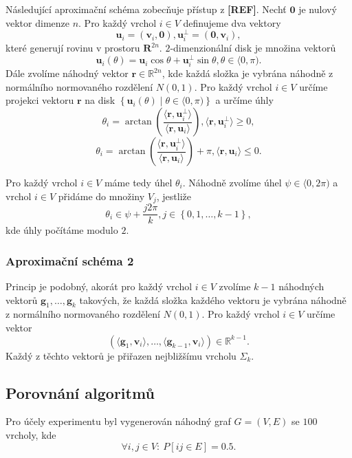 Následující aproximační schéma zobecňuje přístup z \textbf{[REF]}. Nechť $\mathbf{0}$ je nulový vektor dimenze $n$. Pro každý vrchol $i \in V$ definujeme dva vektory
$$
    \mathbf{u}_i = \left( \mathbf{v}_i, \mathbf{0} \right), \mathbf{u}_i^\bot = \left( \mathbf{0}, \mathbf{v}_i \right),
$$
které generují rovinu v prostoru $\mathbf{R}^{2n}$. $2$-dimenzionální disk je množina vektorů
$$
    \mathbf{u}_i(\theta) = \mathbf{u}_i \cos \theta + \mathbf{u}_i^\bot \sin \theta, \theta \in \langle 0, \pi).
$$
Dále zvolíme náhodný vektor $\mathbf{r} \in \mathbb{R}^{2n}$, kde každá složka je vybrána náhodně z normálního normovaného rozdělení $N(0,1)$. Pro každý vrchol $i \in V$ určíme projekci vektoru $\mathbf{r}$ na disk $\left\{ \mathbf{u}_i(\theta) \mid \theta \in \langle 0, \pi ) \right\}$ a určíme úhly
$$
    \theta_i = \arctan \left( \frac{\langle \mathbf{r}, \mathbf{u}_i^\bot \rangle}{\langle \mathbf{r}, \mathbf{u}_i \rangle} \right), \langle \mathbf{r}, \mathbf{u}_i^\bot \rangle \geq 0,
$$
$$
    \theta_i = \arctan \left( \frac{\langle \mathbf{r}, \mathbf{u}_i^\bot \rangle}{\langle \mathbf{r}, \mathbf{u}_i \rangle} \right) + \pi,\langle \mathbf{r}, \mathbf{u}_i \rangle \leq 0.
$$

Pro každý vrchol $i \in V$ máme tedy úhel $\theta_i$. Náhodně zvolíme úhel $\psi \in \langle 0, 2 \pi )$ a vrchol $i \in V$ přidáme do množiny $V_j$, jestliže
$$
    \theta_i \in \psi + \frac{j 2 \pi}{k}, j \in \left\{ 0, 1, \dots, k-1 \right\},
$$
kde úhly počítáme modulo $2$.


\subsubsection*{Aproximační schéma 2}

Princip je podobný, akorát pro každý vrchol $i \in V$ zvolíme $k-1$ náhodných vektorů $\mathbf{g}_1, \dots, \mathbf{g}_k$ takových, že každá složka každého vektoru je vybrána náhodně z normálního normovaného rozdělení $N(0,1)$. Pro každý vrchol $i \in V$ určíme vektor
$$
    \left( \langle \mathbf{g}_1, \mathbf{v}_i \rangle, \dots, \langle \mathbf{g}_{k-1}, \mathbf{v}_i \rangle \right) \in \mathbb{R}^{k-1}.
$$
Každý z těchto vektorů je přiřazen nejbližšímu vrcholu $\Sigma_k$.

\subsection{Porovnání algoritmů}

Pro účely experimentu byl vygenerován náhodný graf $G=(V,E)$ se $100$ vrcholy, kde
$$
    \forall i,j \in V:\ P\left[ ij \in E \right] = 0.5.
$$

